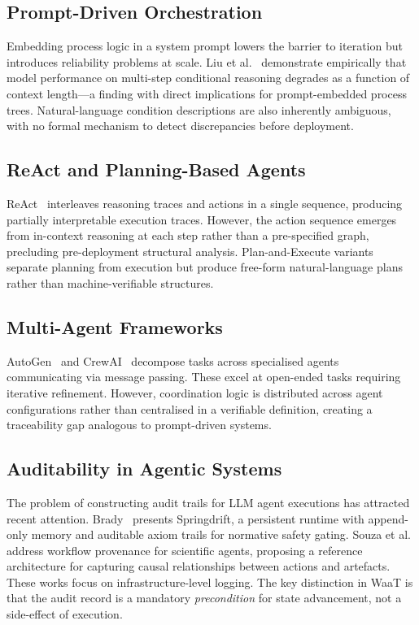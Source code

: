 \documentclass[10pt,conference]{IEEEtran}
\begin{document}
\subsection{Prompt-Driven Orchestration}

Embedding process logic in a system prompt lowers the barrier to
iteration but introduces reliability problems at scale.  Liu et
al.~\cite{liu2023lost} demonstrate empirically that model
performance on multi-step conditional reasoning degrades as a
function of context length---a finding with direct implications for
prompt-embedded process trees.  Natural-language condition
descriptions are also inherently ambiguous, with no formal
mechanism to detect discrepancies before deployment.

\subsection{ReAct and Planning-Based Agents}

ReAct~\cite{yao2023react} interleaves reasoning traces and actions
in a single sequence, producing partially interpretable execution
traces.  However, the action sequence emerges from in-context
reasoning at each step rather than a pre-specified graph,
precluding pre-deployment structural analysis.  Plan-and-Execute
variants~\cite{wang2024survey} separate planning from execution
but produce free-form natural-language plans rather than
machine-verifiable structures.

\subsection{Multi-Agent Frameworks}

AutoGen~\cite{wu2023autogen} and CrewAI~\cite{crewai2024} decompose
tasks across specialised agents communicating via message passing.
These excel at open-ended tasks requiring iterative refinement.
However, coordination logic is distributed across agent
configurations rather than centralised in a verifiable definition,
creating a traceability gap analogous to prompt-driven systems.

\subsection{Auditability in Agentic Systems}

The problem of constructing audit trails for LLM agent executions
has attracted recent attention.  Brady~\cite{brady2026springdrift}
presents Springdrift, a persistent runtime with append-only memory
and auditable axiom trails for normative safety gating.
Souza et al.~\cite{souza2025provenance} address workflow provenance
for scientific agents, proposing a reference architecture for
capturing causal relationships between actions and artefacts.
These works focus on infrastructure-level logging.  The key
distinction in WaaT is that the audit record is a mandatory
\emph{precondition} for state advancement, not a side-effect of
execution.
\end{document}
